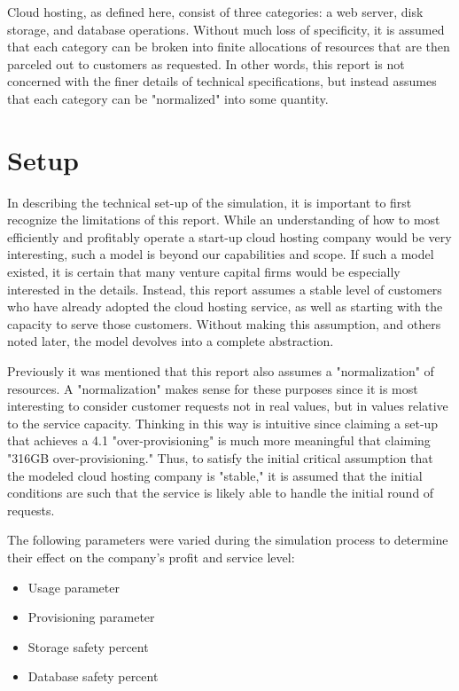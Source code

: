 \documentclass[12pt]{article} %
\begin{document}
Cloud hosting, as defined here, consist of three categories: a web server, disk storage, and database operations.
Without much loss of specificity, it is assumed that each category can be broken into finite allocations of resources that are then parceled out to customers as requested.
In other words, this report is not concerned with the finer details of technical specifications, but instead assumes that each category can be "normalized" into some quantity.
\section{Setup}
In describing the technical set-up of the simulation, it is important to first recognize the limitations of this report.
While an understanding of how to most efficiently and profitably operate a start-up cloud hosting company would be very interesting, such a model is beyond our capabilities and scope.
If such a model existed, it is certain that many venture capital firms would be especially interested in the details.
Instead, this report assumes a stable level of customers who have already adopted the cloud hosting service, as well as starting with the capacity to serve those customers.
Without making this assumption, and others noted later, the model devolves into a complete abstraction.

Previously it was mentioned that this report also assumes a "normalization" of resources.  
A "normalization" makes sense for these purposes since it is most interesting to consider customer requests not in real values, but in values relative to the service capacity.
Thinking in this way is intuitive since claiming a set-up that achieves a 4.1 "over-provisioning" is much more meaningful that claiming "316GB over-provisioning."
Thus, to satisfy the initial critical assumption that the modeled cloud hosting company is "stable," it is assumed that the initial conditions are such that the service is likely able to handle the initial round of requests.

The following parameters were varied during the simulation process to determine their effect on the company's profit and service level:
\begin{itemize}
    \item Usage parameter
    \item Provisioning parameter
    \item Storage safety percent
    \item Database safety percent
\end{itemize}
\end{document}
